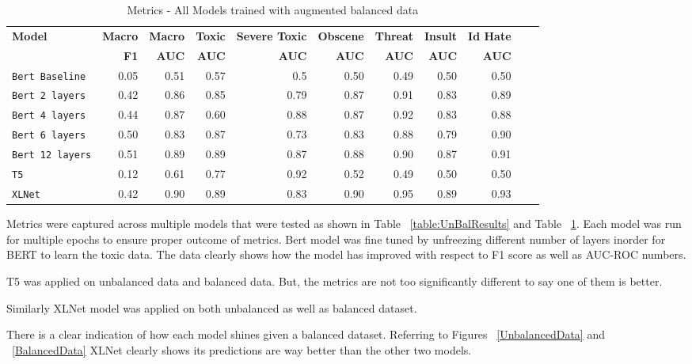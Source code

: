 \documentclass[11pt,a4paper]{article}
\begin{document}
\begin{table}
\centering
\begin{tabular}{lrrrrrrrrrr}
\hline
\textbf{Model} & \textbf{Macro} & \textbf{Macro} & \textbf{Toxic} & \textbf{Severe Toxic} & \textbf{Obscene} & \textbf{Threat} & \textbf{Insult} & \textbf{Id Hate}
\\
\textbf{ } & \textbf{F1} & \textbf{AUC} & \textbf{AUC} & \textbf{AUC} & \textbf{AUC} & \textbf{AUC} & \textbf{AUC} & \textbf{AUC}\\
\hline
\verb|Bert Baseline| & 0.05 & 0.51 & 0.57 & 0.5 & 0.50 & 0.49 & 0.50 & 0.50 \\
\verb|Bert 2 layers| & 0.42 & 0.86 & 0.85 & 0.79 & 0.87 & 0.91 & 0.83 & 0.89 \\
\verb|Bert 4 layers| & 0.44 & 0.87 & 0.60 & 0.88 & 0.87 & 0.92 & 0.83 & 0.88 \\
\verb|Bert 6 layers| & 0.50 & 0.83 & 0.87 & 0.73 & 0.83 & 0.88 & 0.79 & 0.90 \\
\verb|Bert 12 layers| & 0.51 & 0.89 & 0.89 & 0.87 & 0.88 & 0.90 & 0.87 & 0.91 \\
\verb|T5| & 0.12 & 0.61 & 0.77 & 0.92 & 0.52 & 0.49 & 0.50 & 0.50 \\
\verb|XLNet| & 0.42 & 0.90 & 0.89 & 0.83 & 0.90 & 0.95 & 0.89 & 0.93 \\
\hline
\end{tabular}
\caption{Metrics - All Models trained with augmented balanced data}
\label{table:BalResults}
\end{table}

Metrics were captured across multiple models that were tested as shown in Table ~\ref{table:UnBalResults} and Table ~\ref{table:BalResults}. Each model was run for multiple epochs to ensure proper outcome of metrics. Bert model was fine tuned by unfreezing different number of layers inorder for BERT to learn the toxic data. The data clearly shows how the model has improved with respect to F1 score as well as AUC-ROC numbers.

T5 was applied on unbalanced data and balanced data. But, the metrics are not too significantly different to say one of them is better.

Similarly XLNet model was applied on both unbalanced as well as balanced dataset.

There is a clear indication of how each model shines given a balanced dataset. Referring to Figures ~\ref{UnbalancedData} and ~\ref{BalancedData} XLNet clearly shows its predictions are way better than the other two models.
\end{document}
